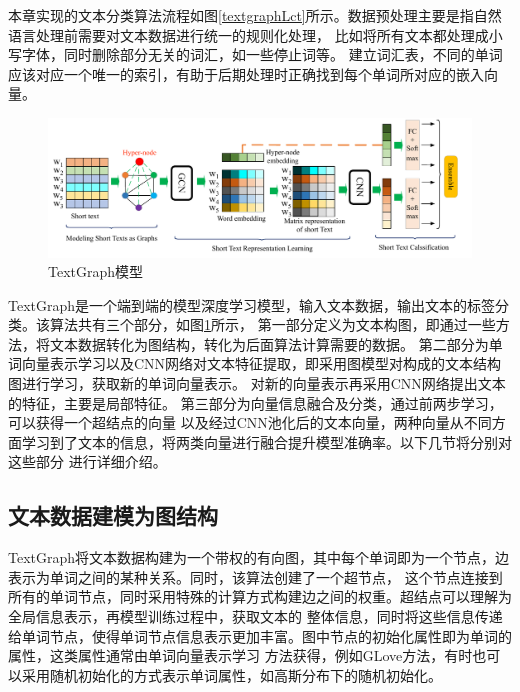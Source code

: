 本章实现的文本分类算法流程如图\ref{textgraphLct}所示。数据预处理主要是指自然语言处理前需要对文本数据进行统一的规则化处理，
比如将所有文本都处理成小写字体，同时删除部分无关的词汇，如一些停止词等。
建立词汇表，不同的单词应该对应一个唯一的索引，有助于后期处理时正确找到每个单词所对应的嵌入向量。
\begin{figure}[htb]%
	\setlength{\belowcaptionskip}{0pt}
	\centering
	\includegraphics[width=1\textwidth]{pic/TextGraph-arch.pdf}
	\caption{TextGraph模型}
	\label{TextGraph}
\end{figure}

TextGraph是一个端到端的模型深度学习模型，输入文本数据，输出文本的标签分类。该算法共有三个部分，如图\ref{TextGraph}所示，
第一部分定义为文本构图，即通过一些方法，将文本数据转化为图结构，转化为后面算法计算需要的数据。
第二部分为单词向量表示学习以及CNN网络对文本特征提取，即采用图模型对构成的文本结构图进行学习，获取新的单词向量表示。
对新的向量表示再采用CNN网络提出文本的特征，主要是局部特征。
第三部分为向量信息融合及分类，通过前两步学习，可以获得一个超结点的向量
以及经过CNN池化后的文本向量，两种向量从不同方面学习到了文本的信息，将两类向量进行融合提升模型准确率。以下几节将分别对这些部分
进行详细介绍。
\subsection{文本数据建模为图结构}
TextGraph将文本数据构建为一个带权的有向图，其中每个单词即为一个节点，边表示为单词之间的某种关系。同时，该算法创建了一个超节点，
这个节点连接到所有的单词节点，同时采用特殊的计算方式构建边之间的权重。超结点可以理解为全局信息表示，再模型训练过程中，获取文本的
整体信息，同时将这些信息传递给单词节点，使得单词节点信息表示更加丰富。图中节点的初始化属性即为单词的属性，这类属性通常由单词向量表示学习
方法获得，例如GLove方法，有时也可以采用随机初始化的方式表示单词属性，如高斯分布下的随机初始化。

